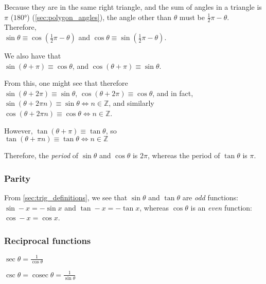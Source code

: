 \documentclass[a4paper,11pt]{article}
\begin{document}

    Because they are in the same right triangle, and the sum of angles in a
    triangle is $\pi$ ($\ang{180}$) (\ref{sec:polygon_angles}), the angle other
    than $\theta$ must be $\frac 12 \pi - \theta$. Therefore,
    \\$\sin \theta \equiv \cos(\frac 12 \pi - \theta)$ and
    $\cos \theta \equiv \sin(\frac 12 \pi - \theta)$.

    We also have that
    \\$\sin(\theta + \pi) \equiv \cos \theta$, and
    $\cos(\theta + \pi) \equiv \sin \theta$.

    From this, one might see that therefore
    \\$\sin(\theta + 2\pi) \equiv \sin \theta$,
    $\cos(\theta + 2\pi) \equiv \cos \theta$, and in fact,
    \\$\sin(\theta + 2\pi n) \equiv \sin \theta \iff n \in \mathbb{Z}$,
    and similarly
    \\$\cos(\theta + 2\pi n) \equiv \cos \theta \iff n \in \mathbb{Z}$.

    However, $\tan(\theta + \pi) \equiv \tan \theta$, so
    \\$\tan(\theta + \pi n) \equiv \tan \theta \iff n \in \mathbb{Z}$

    Therefore, the \textit{period} of $\sin \theta$ and $\cos \theta$ is $2\pi$,
    whereas the period of $\tan \theta$ is $\pi$.

    \subsubsection{Parity} \label{sec:trig_parity}

    From \ref{sec:trig_definitions}, we see that $\sin \theta$ and $\tan \theta$
    are \textit{odd} functions:
    \\$\sin -x = -\sin x$ and $\tan -x = -\tan x$,
    whereas $\cos \theta$ is an \textit{even} function:
    \\$\cos -x = \cos x$.

    \subsubsection{Reciprocal functions} \label{sec:trig_reciprocal}

    $\displaystyle\sec \theta = \frac{1}{\cos \theta}$

    $\displaystyle\csc \theta = \operatorname{cosec} \theta
        = \frac{1}{\sin \theta}$
\end{document}
